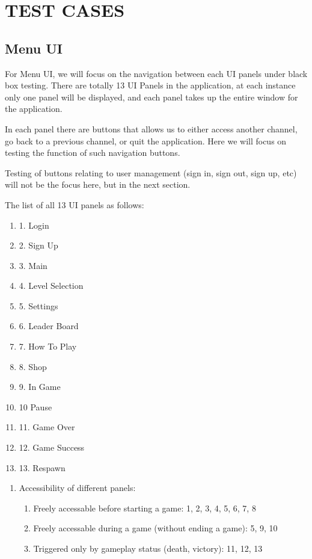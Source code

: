 \documentclass[11pt]{article}
\begin{document}
    \section{TEST CASES}
    
    \subsection{Menu UI}
    For Menu UI, we will focus on the navigation between each UI panels under black box testing. There are totally 13 UI Panels in the application, at each instance only one panel will be displayed, and each panel takes up the entire window for the application.

    In each panel there are buttons that allows us to either access another channel, go back to a previous channel, or quit the application. Here we will focus on testing the function of such navigation buttons. 
    
    Testing of buttons relating to user management (sign in, sign out, sign up, etc) will not be the focus here, but in the next section.
    
    The list of all 13 UI panels as follows:
        \begin{enumerate}
            \item 1. Login
            \item 2. Sign Up
            \item 3. Main
            \item 4. Level Selection
            \item 5. Settings
            \item 6. Leader Board
            \item 7. How To Play
            \item 8. Shop
            \item 9. In Game
            \item 10 Pause
            \item 11. Game Over
            \item 12. Game Success
            \item 13. Respawn
        \end{enumerate}    

        \begin{enumerate}
            \item Accessibility of different panels:
            \begin{enumerate}
                \item Freely accessable before starting a game: 1, 2, 3, 4, 5, 6, 7, 8
                \item Freely accessable during a game (without ending a game): 5, 9, 10
                \item Triggered only by gameplay status (death, victory): 11, 12, 13
            \end{enumerate}
        \end{enumerate}
\end{document}
